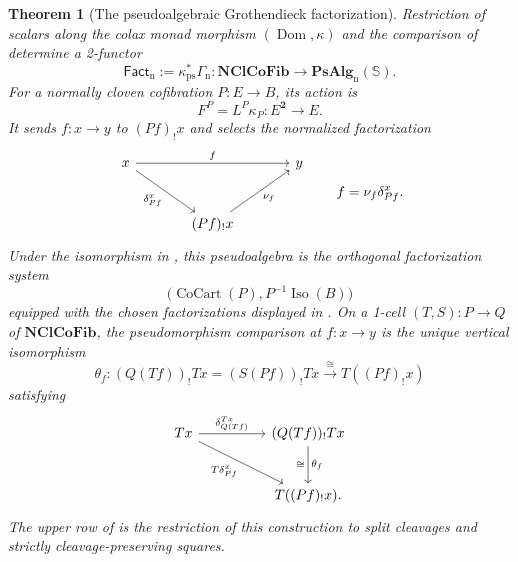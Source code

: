 \documentclass[11pt]{article}
\theoremstyle{plain}
\newtheorem{theorem}{Theorem}[section]
\theoremstyle{definition}
\theoremstyle{remark}
\newcommand{\NClCoFib}{\mathbf{NClCoFib}}
\newcommand{\PsAlg}{\mathbf{PsAlg}}
\newcommand{\CoCart}{\operatorname{CoCart}}
\newcommand{\Iso}{\operatorname{Iso}}
\newcommand{\Dom}{\operatorname{Dom}}
\newcommand{\Sq}{\mathbb{S}}
\newcommand{\Fact}{\mathsf{Fact}}
\numberwithin{equation}{section}
\begin{document}
\begin{theorem}[The pseudoalgebraic Grothendieck factorization]
\label{thm:pseudo-grothendieck-factorization}
Restriction of scalars along the colax monad morphism
$(\Dom,\kappa)$ and the comparison of
 determine a 2-functor
\begin{equation}
  \Fact_{\mathrm n}:=
  \kappa^*_{\mathrm{ps}}\Gamma_{\mathrm n}\colon
  \NClCoFib\longrightarrow\PsAlg_{\mathrm n}(\Sq).
  \label{eq:pseudo-Fact-definition}
\end{equation}
For a normally cloven cofibration $P\colon E\to B$, its action is
\begin{equation*}
  F^P=L^P\kappa_P\colon E^{\mathbf 2}\longrightarrow E.
\end{equation*}
It sends $f\colon x\to y$ to $(Pf)_!x$ and selects the normalized
factorization
\begin{equation}
\begin{tikzcd}[column sep=large,row sep=large]
x \arrow[rr,"f"] \arrow[dr,"\delta^x_{Pf}"']
&&y\\
&(Pf)_!x\arrow[ur,"\nu_f"']&
\end{tikzcd}
\qquad f=\nu_f\delta^x_{Pf}.
\label{eq:pseudo-Fact-factors}
\end{equation}
Under the isomorphism in
, this pseudoalgebra is the orthogonal
factorization system
\begin{equation}
  \bigl(\CoCart(P),P^{-1}\Iso(B)\bigr)
  \label{eq:pseudo-Fact-OFS}
\end{equation}
equipped with the chosen factorizations displayed in
.  On a 1-cell
$(T,S)\colon P\to Q$ of $\NClCoFib$, the pseudomorphism comparison at
$f\colon x\to y$ is the unique vertical isomorphism
\begin{equation}
  \theta_f\colon
  (Q(Tf))_!Tx=(S(Pf))_!Tx
  \xrightarrow{\ \cong\ }T((Pf)_!x)
  \label{eq:pseudo-Fact-morphism}
\end{equation}
satisfying
\begin{equation}
\begin{tikzcd}[column sep=huge,row sep=large]
Tx \arrow[r,"{\delta^{Tx}_{Q(Tf)}}"]
  \arrow[dr,"{T\delta^x_{Pf}}"']
  & (Q(Tf))_!Tx \arrow[d,"{\theta_f}","{\cong}"'] \\
  & T((Pf)_!x).
\end{tikzcd}
\label{eq:pseudo-Fact-comparison-triangle}
\end{equation}
The upper row of  is the restriction of
this construction to split cleavages and strictly
cleavage-preserving squares.
\end{theorem}
\end{document}
